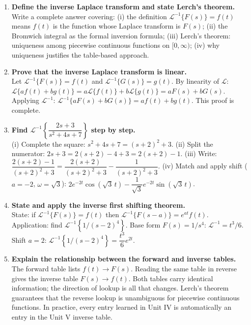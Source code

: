 \documentclass[12pt,a4paper]{article}
\begin{document}
\begin{enumerate}

\item \textbf{Define the inverse Laplace transform and state Lerch's theorem.}\\
Write a complete answer covering: (i) the definition $\mathcal{L}^{-1}\{F(s)\}=f(t)$
means $f(t)$ is the function whose Laplace transform is $F(s)$;
(ii) the Bromwich integral as the formal inversion formula;
(iii) Lerch's theorem: uniqueness among piecewise continuous functions on
$[0,\infty)$; (iv) why uniqueness justifies the table-based approach.

\item \textbf{Prove that the inverse Laplace transform is linear.}\\
Let $\mathcal{L}^{-1}\{F(s)\}=f(t)$ and $\mathcal{L}^{-1}\{G(s)\}=g(t)$.
By linearity of $\mathcal{L}$:
$\mathcal{L}\{af(t)+bg(t)\}=a\mathcal{L}\{f(t)\}+b\mathcal{L}\{g(t)\}=aF(s)+bG(s)$.
Applying $\mathcal{L}^{-1}$: $\mathcal{L}^{-1}\{aF(s)+bG(s)\}=af(t)+bg(t)$.
This proof is complete.

\item \textbf{Find $\mathcal{L}^{-1}\!\left\{\dfrac{2s+3}{s^2+4s+7}\right\}$ step by step.}\\
(i) Complete the square: $s^2+4s+7=(s+2)^2+3$.
(ii) Split the numerator: $2s+3=2(s+2)-4+3=2(s+2)-1$.
(iii) Write: $\dfrac{2(s+2)-1}{(s+2)^2+3}=\dfrac{2(s+2)}{(s+2)^2+3}-\dfrac{1}{(s+2)^2+3}$.
(iv) Match and apply shift ($a=-2$, $\omega=\sqrt{3}$):
$2e^{-2t}\cos(\sqrt{3}\,t)-\dfrac{1}{\sqrt{3}}e^{-2t}\sin(\sqrt{3}\,t)$.

\item \textbf{State and apply the inverse first shifting theorem.}\\
State: if $\mathcal{L}^{-1}\{F(s)\}=f(t)$ then $\mathcal{L}^{-1}\{F(s-a)\}=e^{at}f(t)$.
Application: find $\mathcal{L}^{-1}\!\left\{1/(s-2)^4\right\}$.
Base form $F(s)=1/s^4$: $\mathcal{L}^{-1}=t^3/6$. Shift $a=2$:
$\mathcal{L}^{-1}\!\left\{1/(s-2)^4\right\}=\dfrac{t^3}{6}e^{2t}$.

\item \textbf{Explain the relationship between the forward and inverse tables.}\\
The forward table lists $f(t) \to F(s)$. Reading the same table in reverse
gives the inverse table $F(s) \to f(t)$. Both tables carry identical
information; the direction of lookup is all that changes. Lerch's theorem
guarantees that the reverse lookup is unambiguous for piecewise continuous
functions. In practice, every entry learned in Unit IV is automatically
an entry in the Unit V inverse table.

\end{enumerate}
\end{document}
